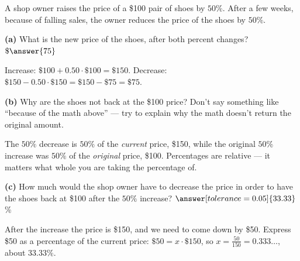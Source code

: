 \documentclass[12pt]{ximera}
\begin{document}
\begin{problem}
A shop owner raises the price of a \$100 pair of shoes by $50\%$. After a few weeks,
because of falling sales, the owner reduces the price of the shoes by $50\%$.

\begin{prompt}
\textbf{(a)} What is the new price of the shoes, after both percent changes?
$\$\answer{75}$

\begin{solution}
Increase: $\$100 + 0.50 \cdot \$100 = \$150$.
Decrease: $\$150 - 0.50 \cdot \$150 = \$150 - \$75 = \$75$.
\end{solution}
\end{prompt}

\begin{prompt}
\textbf{(b)} Why are the shoes not back at the \$100 price? Don't say something like
``because of the math above'' --- try to explain why the math doesn't return the
original amount.
\begin{freeResponse}
\end{freeResponse}

\begin{solution}
The $50\%$ decrease is $50\%$ of the \emph{current} price, \$150, while the original
$50\%$ increase was $50\%$ of the \emph{original} price, \$100. Percentages are
relative --- it matters what whole you are taking the percentage of.
\end{solution}
\end{prompt}

\begin{prompt}
\textbf{(c)} How much would the shop owner have to decrease the price in order to
have the shoes back at \$100 after the $50\%$ increase?
$\answer[tolerance=0.05]{33.33}$\%

\begin{solution}
After the increase the price is \$150, and we need to come down by \$50. Express \$50
as a percentage of the current price: $\$50 = x \cdot \$150$, so
$x = \frac{50}{150} = 0.333\ldots$, about $33.33\%$.
\end{solution}
\end{prompt}
\end{problem}
\end{document}
